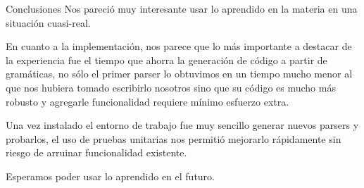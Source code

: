 \documentclass[a4paper,8pt]{article}
\begin{document}
\newpage
\begin{section}{Conclusiones}
Nos pareció muy interesante usar lo aprendido en la materia en una situación cuasi-real.

En cuanto a la implementación, nos parece que lo más importante a destacar de la experiencia fue el tiempo que ahorra la generación de código a partir de gramáticas, no sólo el primer parser lo obtuvimos en un tiempo mucho menor al que nos hubiera tomado escribirlo nosotros sino que su código es mucho más robusto y agregarle funcionalidad requiere mínimo esfuerzo extra. 

Una vez instalado el entorno de trabajo fue muy sencillo generar nuevos parsers y probarlos, el uso de pruebas unitarias nos permitió mejorarlo rápidamente sin riesgo de arruinar funcionalidad existente.

Esperamos poder usar lo aprendido en el futuro.
\end{section}
\newpage
\end{document}
